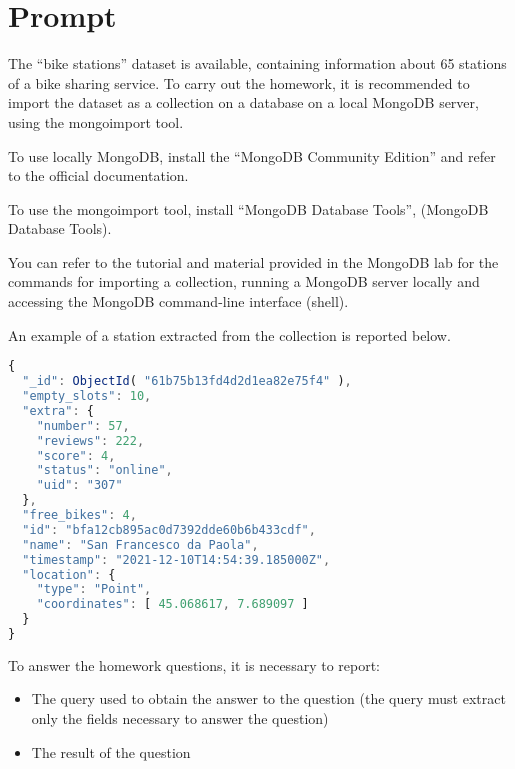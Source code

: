 \section{Prompt}

\par
The “bike stations” dataset is available, containing information about 65
stations of a bike sharing service. To carry out the homework, it is
recommended to import the dataset as a collection on a database on a local
MongoDB server, using the mongoimport tool.

\begin{tcolorbox}[width=\textwidth, title={Note},]
  To use locally MongoDB, install the “MongoDB Community Edition” and
  refer to the official
  documentation.
\end{tcolorbox}
\begin{tcolorbox}[width=\textwidth, title={Note},]
  To use the mongoimport tool, install “MongoDB Database Tools”,
  (MongoDB Database Tools).
\end{tcolorbox}

\par
You can refer to the tutorial and material provided in the MongoDB lab for
the commands for importing a
collection, running a MongoDB server locally and accessing the MongoDB
command-line interface (shell).

\par
An example of a station extracted from the collection is reported below.

\begin{lstlisting}[language=js]
{
  "_id": ObjectId( "61b75b13fd4d2d1ea82e75f4" ),
  "empty_slots": 10,
  "extra": {
    "number": 57,
    "reviews": 222,
    "score": 4,
    "status": "online",
    "uid": "307"
  },
  "free_bikes": 4,
  "id": "bfa12cb895ac0d7392dde60b6b433cdf",
  "name": "San Francesco da Paola",
  "timestamp": "2021-12-10T14:54:39.185000Z",
  "location": {
    "type": "Point",
    "coordinates": [ 45.068617, 7.689097 ]
  }
}
\end{lstlisting}

\par

To answer the homework questions, it is necessary to report:
\begin{itemize}
  \item The query used to obtain the answer to the question (the query must
  extract only the fields necessary to
  answer the question)
  \item The result of the question
\end{itemize}